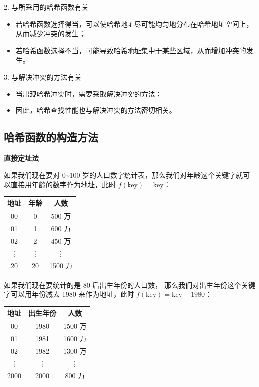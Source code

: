 \documentclass[lang=cn,newtx,10pt,scheme=chinese]{elegantbook}
\begin{document}
  2. 与所采用的哈希函数有关  

     \begin{itemize}
       \item 若哈希函数选择得当，可以使哈希地址尽可能均匀地分布在哈希地址空间上，从而减少冲突的发生；
       \item 若哈希函数选择不当，可能导致哈希地址集中于某些区域，从而增加冲突的发生。
     \end{itemize}
  
  3. 与解决冲突的方法有关 

     \begin{itemize}
       \item 当出现哈希冲突时，需要采取解决冲突的方法；
       \item 因此，哈希查找性能也与解决冲突的方法密切相关。
     \end{itemize}
     
\subsection{哈希函数的构造方法}

\textbf{直接定址法}

如果我们现在要对 0\textasciitilde 100 岁的人口数字统计表，那么我们对年龄这个关键字就可以直接用年龄的数字作为地址，此时 $f(\text{key}) = \text{key}$：

\begin{center}
\begin{tabular}{|c|c|c|}
\hline
地址 & 年龄 & 人数 \\
\hline
00 & 0 & 500 万 \\
01 & 1 & 600 万 \\
02 & 2 & 450 万 \\
\vdots & \vdots & \vdots \\
20 & 20 & 1500 万 \\
\hline
\end{tabular}
\end{center}

如果我们现在要统计的是 80 后出生年份的人口数，
那么我们对出生年份这个关键字可以用年份减去 1980 来作为地址，此时 $f(\text{key}) = \text{key} - 1980$：

\begin{center}
\begin{tabular}{|c|c|c|}
\hline
地址 & 出生年份 & 人数 \\
\hline
00 & 1980 & 1500 万 \\
01 & 1981 & 1600 万 \\
02 & 1982 & 1300 万 \\
\vdots & \vdots & \vdots \\
2000 & 2000 & 800 万 \\
\hline
\end{tabular}
\end{center}
\end{document}
